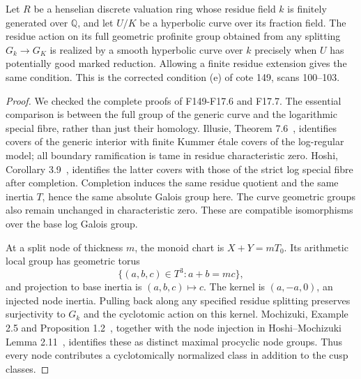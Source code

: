 \begin{proposition}
\label{F-reduction}
Let $R$ be a henselian discrete valuation ring whose residue field
$k$ is finitely generated over $\mathbb Q$, and let $U/K$ be a
hyperbolic curve over its fraction field. The residue action on
its full geometric profinite group obtained from any splitting
$G_k\to G_K$ is realized by a smooth hyperbolic curve over $k$
precisely when $U$ has potentially good marked reduction. Allowing
a finite residue extension gives the same condition. This is the
corrected condition (e) of cote 149, scans 100--103.
\end{proposition}
\begin{proof}
We checked the complete proofs of F149-F17.6 and F17.7. The
essential comparison is between the full group of the generic
curve and the logarithmic special fibre, rather than just their
homology. Illusie, Theorem 7.6~\cite{F-Illusie}, identifies covers
of the generic interior with finite Kummer \'etale covers of the
log-regular model; all boundary ramification is tame in residue
characteristic zero. Hoshi, Corollary 3.9~\cite{F-HoshiLog},
identifies the latter covers with those of the strict log special
fibre after completion. Completion induces the same residue
quotient and the same inertia $T$, hence the same absolute Galois
group here. The curve geometric groups also remain unchanged in
characteristic zero. These are compatible isomorphisms over the
base log Galois group.

At a split node of thickness $m$, the monoid chart is
$X+Y=mT_0$. Its arithmetic local group has geometric torus
\[
 \{(a,b,c)\in T^3:a+b=mc\},
\]
and projection to base inertia is $(a,b,c)\mapsto c$. The kernel
is $(a,-a,0)$, an injected node inertia. Pulling back along any
specified residue splitting preserves surjectivity to $G_k$ and
the cyclotomic action on this kernel. Mochizuki, Example 2.5 and
Proposition 1.2~\cite{F-MochizukiCombinatorial}, together with the
node injection in Hoshi--Mochizuki Lemma 2.11~\cite{F-HoshiMochizukiNodes},
identifies these as distinct maximal procyclic node groups.
Thus every node contributes a cyclotomically normalized class
in addition to the cusp classes.


\end{proof}
